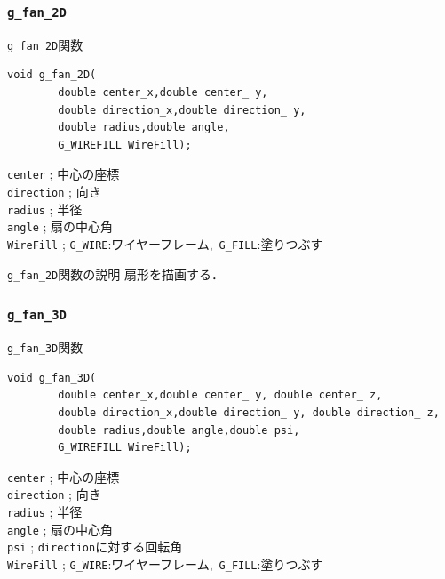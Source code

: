 \documentclass[a4paper,12pt]{jsarticle}%
\begin{document}
\clearpage
\subsubsection{\texttt{g\_fan\_2D}}

\begin{itembox}[l]{\texttt{g\_fan\_2D}関数}
\begin{verbatim}
void g_fan_2D(
        double center_x,double center_ y,
        double direction_x,double direction_ y,
        double radius,double angle,
        G_WIREFILL WireFill);   
\end{verbatim}
\verb|center| ; 中心の座標\\
\verb|direction| ; 向き\\
\verb|radius| ; 半径\\
\verb|angle| ; 扇の中心角\\
\verb|WireFill| ; \verb|G_WIRE|:ワイヤーフレーム,\ \verb|G_FILL|:塗りつぶす \\
\end{itembox}

\begin{itembox}[l]{\texttt{g\_fan\_2D}関数の説明}
扇形を描画する．
\end{itembox}

\begin{figure}[htb]
\end{figure}




\clearpage
\subsubsection{\texttt{g\_fan\_3D}}

\begin{itembox}[l]{\texttt{g\_fan\_3D}関数}
\begin{verbatim}
void g_fan_3D(
        double center_x,double center_ y, double center_ z,
        double direction_x,double direction_ y, double direction_ z,
        double radius,double angle,double psi,
        G_WIREFILL WireFill);
\end{verbatim}
\verb|center| ; 中心の座標\\
\verb|direction| ; 向き\\
\verb|radius| ; 半径\\
\verb|angle| ; 扇の中心角\\
\verb|psi| ; \verb|direction|に対する回転角\\
\verb|WireFill| ; \verb|G_WIRE|:ワイヤーフレーム,\ \verb|G_FILL|:塗りつぶす \\
\end{itembox}
\end{document}
